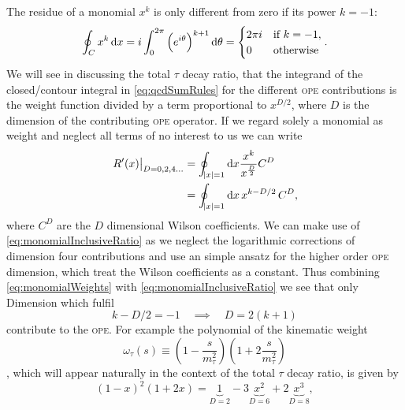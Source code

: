 \documentclass[../../index.tex]{subfiles}
\begin{document}
The residue of a monomial \(x^k\) is only different from zero if its power
\(k=-1\):
\begin{equation}
  \label{eq:monomialWeights}
  \oint_{C} x^k \dif x = i \int_0^{2\pi}\left(e^{i \theta}\right)^{k+1} \dif \theta
  = \begin{cases} \mbox{\(2 \pi i\)} & \mbox{if } k=-1, \\ \mbox{0} & \mbox{otherwise} \end{cases}.
\end{equation}
We will see in discussing the total \(\tau\) decay ratio, that the integrand of
the closed\-/contour integral in \cref{eq:qcdSumRules} for the different
\textsc{ope} contributions is the weight function divided by a term proportional
to \(x^{D/2}\), where \(D\) is the dimension of the contributing \textsc{ope}
operator. If we regard solely a monomial as weight and neglect all terms of no
interest to us we can write
\begin{equation}
  \label{eq:monomialInclusiveRatio}
  \begin{split}
    \left. R^\prime(x) \right\rvert_{D=0,2,4\dots} &= \oint_{\abs{x}=1} \dif x \frac{x^k}{x^{\frac{D}{2}}}C^{D} \\
    &= \oint_{\abs{x}=1} \dif x \,x^{k-D/2} \,C^{D},
  \end{split}
\end{equation}
where \(C^{D}\) are the \(D\) dimensional Wilson coefficients. We can make use
of \cref{eq:monomialInclusiveRatio} as we neglect the logarithmic corrections of
dimension four  contributions and use an simple ansatz for the higher
order \textsc{ope} dimension, which treat the Wilson coefficients as a constant.
Thus combining \cref{eq:monomialWeights} with \cref{eq:monomialInclusiveRatio}
we see that only Dimension which fulfil
\begin{equation}
  k - D/2 = -1 \quad \implies \quad  D = 2(k+1)
\end{equation}
contribute to the \textsc{ope}. For example the polynomial of the kinematic
weight
\begin{equation}
  \label{eq:kinematicWeight}
  \omega_\tau(s) \equiv \left( 1 - \frac{s}{m_\tau^2} \right) \left( 1 + 2 \frac{s}{m_\tau^2} \right)
\end{equation},
which will appear naturally in the context of the total \(\tau\) decay ratio,
is given by
\begin{equation}
  (1 - x)^2 (1 + 2x) = \underbrace{1}_{D=2} - 3\underbrace{x^2}_{D=6} + 2\underbrace{x^3}_{D=8},
\end{equation}
\end{document}
